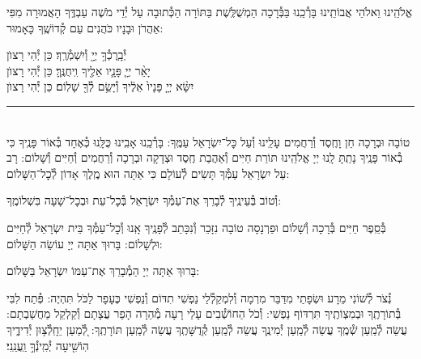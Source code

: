 \documentclass[twoside, openany, parskip=half, 11pt]{book}
\begin{document}
\retzeh

\yaalehveyavo

\zion

\modim

\alhanisim

\weekdaysahodos

אֱלֹהֵֽינוּ וֵאלֹהֵי אֲבוֹתֵֽינוּ בָּרְ֯כֵֽנוּ בַּבְּ֯רָכָה הַמְשֻׁלֶּֽשֶׁת בַּתּוֹרָה
הַכְּ֯תוּבָה עַל יְ֯דֵי מֹשֶׁה עַבְדֶּֽךָ הָאֲמוּרָה מִפִּי אַהֲרֹן וּבָנָיו כֹּהֲנִים עַם קְ֯דוֹשֶֽׁךָ כָּאָמוּר:

יְ֯בָֽרֶכְ֯ךָ֥ יְיָ֖ וְ֯יִשְׁמְ֯רֶֽךָ׃ \hfill \kahal כֵּן יְ֯הִי רָצוׂן \\
יָאֵ֨ר יְיָ֧ פָּנָ֛יו אֵלֶ֖יךָ וִֽיחֻנֶּֽךָּ׃ \hfill \kahal כֵּן יְ֯הִי רָצוׂן \\
יִשָּׂ֨א יְיָ֤ פָּנָיו֙ אֵלֶ֔יךָ וְ֯יָשֵׂ֥ם לְ֯ךָ֖ שָׁלֽוֹם׃ \hfill \kahal כֵּן יְ֯הִי רָצוׂן

\rule[-0.5ex]{3in}{1pt}

\begin{paracol}{2}
\\
טוֹבָה וּבְרָכָה חֵן וָחֶֽסֶד וְ֯רַחֲמִים עָלֵֽינוּ וְ֯עַל כׇּל־יִשְׂרָאֵל עַמֶּֽךָ: בָּרְ֯כֵֽנוּ אָבִֽינוּ כֻּלָּֽנוּ כְּ֯אֶחָד בְּ֯אוֹר פָּנֶֽיךָ כִּי בְ֯אוֹר פָּנֶֽיךָ נָתַֽתָּ לָֽנוּ יְיָ אֱלֹהֵֽינוּ תּוֹרַת חַיִּים וְ֯אַהֲבַת חֶֽסֶד וּצְדָקָה וּבְרָכָה וְ֯רַחֲמִים וְ֯חַיִּים וְ֯שָׁלוֹם:
\switchcolumn
{}
רָב עַל יִשְׂרָאֵל עַמְּ֯ךָ תָּשִׂים לְ֯עוֹלָם כִּי אַתָּה הוּא מֶֽלֶךְ אָדוֹן לְ֯כׇל־הַשָּׁלוֹם:
\end{paracol}
וְ֯טוֹב בְּ֯עֵינֶֽיךָ לְ֯בָרֵךְ אֶת־עַמְּ֯ךָ יִשְׂרָאֵל בְּ֯כׇל־עֵת וּבְכׇל־שָׁעָה בִּשְׁלוֹמֶֽךָ:


\begin{paracol}{2}
\begin{small}
בְּ֯סֵֽפֶר חַיִּים בְּ֯רָכָה וְ֯שָׁלוֹם וּפַרְנָסָה טוֹבָה נִזָּכֵר וְ֯נִכָּתֵב לְ֯פָנֶֽיךָ אָֽנוּ וְ֯כׇל־עַמְּ֯ךָ בֵּית יִשְׂרָאֵל לְ֯חַיִּים וּלְשָׁלוֹם: בָּרוּךְ אַתָּה יְיָ עוֹשֵׂה הַשָּׁלוֹם:

\end{small}
\switchcolumn
בָּרוּךְ אַתָּה יְיָ הַמְ֯בָרֵךְ אֶת־עַמּוֹ יִשְׂרָאֵל בַּשָּׁלוֹם:

\end{paracol}

נְ֯צֹר לְ֯שׁוֹנִי מֵרָע וּשְׂפָתַי מִדַּבֵּר מִרְמָה וְ֯לִמְקַלְ֯לַי נַפְשִׁי תִדּוֹם וְ֯נַפְשִׁי כֶּעָפָר לַכֹּל תִּהְיֶה: פְּ֯תַח לִבִּי בְּ֯תוֹרָתֶֽךָ וּבְמִצְוֹתֶֽיךָ תִּרְדּוֹף נַפְשִׁי: וְ֯כֹל הַחוֹשְׁ֯בִים עָלַי רָעָה מְ֯הֵרָה הָפֵר עֲצָתָם וְ֯קַלְקֵל מַחֲשַׁבְתָם: עֲשֵׂה לְ֯מַֽעַן שְׁ֯מֶֽךָ עֲשֵׂה לְ֯מַֽעַן יְ֯מִינֶֽךָ עֲשֵׂה לְ֯מַֽעַן קְ֯דֻשָּׁתֶֽךָ עֲשֵׂה לְ֯מַֽעַן תּוֹרָתֶֽךָ: לְ֭֯מַעַן יֵחָֽלְ֯צ֥וּן יְ֯דִידֶ֑יךָ הֽוֹשִׁ֖יעָה יְ֯מִֽינְ֯ךָ֣ וַֽעֲנֵֽנִי׃
\end{document}
